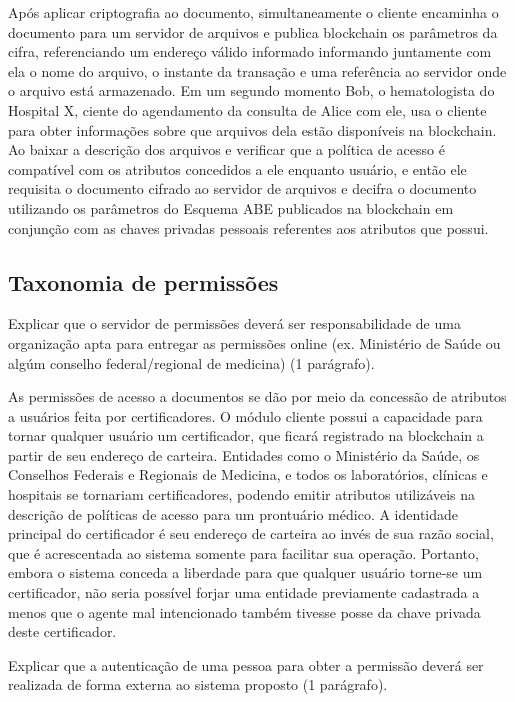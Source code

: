 \documentclass[a4paper,11pt]{article}
\begin{document}
Após aplicar criptografia ao documento, simultaneamente o cliente encaminha o documento para um servidor de arquivos e publica blockchain os parâmetros da cifra, referenciando um endereço válido informado informando juntamente com ela o nome do arquivo, o instante da transação e uma referência ao servidor onde o arquivo está armazenado.
Em um segundo momento Bob, o hematologista do Hospital X, ciente do agendamento da consulta de Alice com ele, usa o cliente para obter informações sobre que arquivos dela estão disponíveis na blockchain.
Ao baixar a descrição dos arquivos e verificar que a política de acesso é compatível com os atributos concedidos a ele enquanto usuário, e então ele requisita o documento cifrado ao servidor de arquivos e decifra o documento utilizando os parâmetros do Esquema ABE publicados na blockchain em conjunção com as chaves privadas pessoais referentes aos atributos que possui.

\subsection{Taxonomia de permissões}

{\color{ForestGreen}Explicar que o servidor de permissões deverá ser responsabilidade de uma organização apta para entregar as permissões online (ex. Ministério de Saúde ou algúm conselho federal/regional de medicina) (1 parágrafo)}.

As permissões de acesso a documentos se dão por meio da concessão de atributos a usuários feita por certificadores. O módulo cliente possui a capacidade para tornar qualquer usuário um certificador, que ficará registrado na blockchain a partir de seu endereço de carteira. Entidades como o Ministério da Saúde, os Conselhos Federais e Regionais de Medicina, e todos os laboratórios, clínicas e hospitais se tornariam certificadores, podendo emitir atributos utilizáveis na descrição de políticas de acesso para um prontuário médico. A identidade principal do certificador é seu endereço de carteira ao invés de sua razão social, que é acrescentada ao sistema somente para facilitar sua operação. Portanto, embora o sistema conceda a liberdade para que qualquer usuário torne-se um certificador, não seria possível forjar uma entidade previamente cadastrada a menos que o agente mal intencionado também tivesse posse da chave privada deste certificador.

{\color{ForestGreen}Explicar que a autenticação de uma pessoa para obter a permissão deverá ser realizada de forma externa ao sistema proposto (1 parágrafo).}
\end{document}

